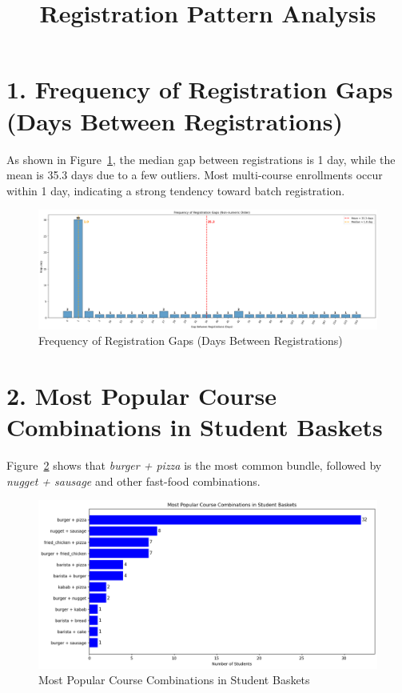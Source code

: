 \documentclass[12pt,a4paper]{article}
\title{Registration Pattern Analysis}
\date{}
\begin{document}
\maketitle

\section*{1. Frequency of Registration Gaps (Days Between Registrations)}
As shown in Figure~\ref{fig:reg-gap}, the median gap between registrations is 1 day, while the mean is 35.3 days due to a few outliers. Most multi-course enrollments occur within 1 day, indicating a strong tendency toward batch registration.

\begin{figure}[h!]
    \centering
    \includegraphics[width=1\textwidth]{Frequency of Registration Gaps (Days between registrations).png}
    \caption{Frequency of Registration Gaps (Days Between Registrations)}
    \label{fig:reg-gap}
\end{figure}

\section*{2. Most Popular Course Combinations in Student Baskets}
Figure~\ref{fig:combo-basket} shows that \textit{burger + pizza} is the most common bundle, followed by \textit{nugget + sausage} and other fast-food combinations.

\begin{figure}[h!]
    \centering
    \includegraphics[width=1\textwidth]{Most Popular Course Combinations in Student Baskets.png}
    \caption{Most Popular Course Combinations in Student Baskets}
    \label{fig:combo-basket}
\end{figure}
\end{document}
